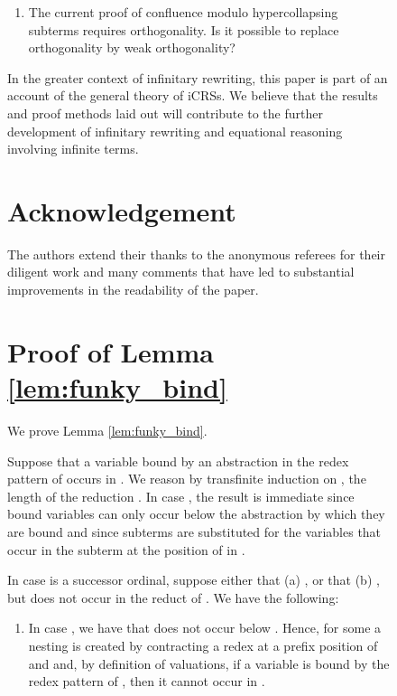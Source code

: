 \documentclass{LMCS}
\theoremstyle{plain}
\theoremstyle{definition}
\begin{document}
\begin{figure}
\begin{enumerate}[]
\item The current proof of confluence modulo hypercollapsing subterms requires
orthogonality. Is it possible to replace orthogonality
by weak orthogonality?

\end{enumerate}

In the greater context of infinitary rewriting, this paper is part of an account of the general theory of iCRSs. We believe that the results and proof methods laid out will contribute to the further development of infinitary rewriting and equational reasoning involving infinite terms.

\section*{Acknowledgement}

\noindent The authors extend their thanks to the anonymous referees
for their diligent work and many comments that have led to substantial
improvements in the readability of the paper.





\newpage

\appendix

\section{Proof of Lemma \ref{lem:funky_bind}}
\label{app:bound}

We prove Lemma \ref{lem:funky_bind}.

\proof
Suppose that a variable bound by an abstraction in the redex pattern of  occurs in . We reason by transfinite induction on , the length of the reduction . In case , the result is immediate since bound variables can only occur below the abstraction by which they are bound and since subterms are substituted for the variables that occur in the subterm at the position of  in .

In case  is a successor ordinal, suppose either that (a) , or that (b) , but  
does not occur in the reduct  of . We have the following:

\begin{enumerate}[]
\item
In case , we have that  does not occur below . Hence, for some  a nesting is created by contracting a redex at a prefix position of  and  and, by definition of valuations, if a variable is bound by the redex pattern of , then it cannot occur in .


\end{enumerate}
\end{figure}
\end{document}
